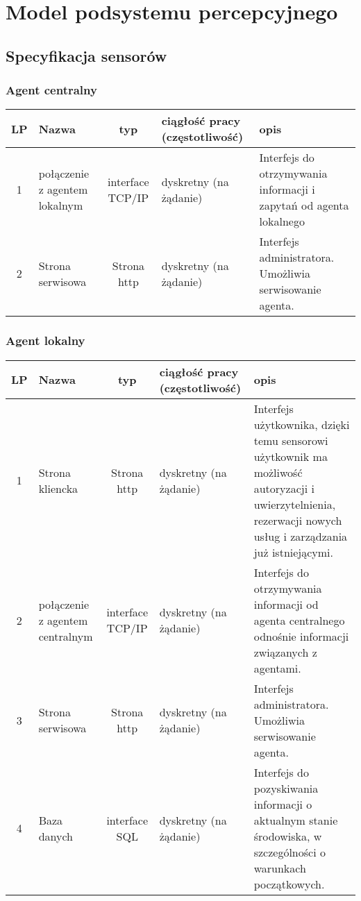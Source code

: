 \section{Model podsystemu percepcyjnego}
\subsection{Specyfikacja sensorów}
\subsubsection{Agent centralny}

\begin{tabular}{c|p{3cm}|c|p{2cm}|p{4cm}}
LP		& Nazwa			& typ			& ciągłość pracy (częstotliwość)	& opis\\
\hline
1 		& połączenie z agentem lokalnym		& interface TCP/IP	& dyskretny (na żądanie) & Interfejs do otrzymywania informacji i zapytań od agenta lokalnego \\
2		& Strona serwisowa		& Strona http	& dyskretny (na żądanie) & Interfejs administratora. Umożliwia serwisowanie agenta.\\
\end{tabular}

\subsubsection{Agent lokalny}

\begin{tabular}{c|p{3cm}|c|p{2cm}|p{4cm}}
LP		& Nazwa			& typ			& ciągłość pracy (częstotliwość) & opis \\
\hline
1 		& Strona kliencka		& Strona http	& dyskretny (na żądanie) & Interfejs użytkownika, dzięki temu sensorowi użytkownik ma możliwość autoryzacji i uwierzytelnienia, rezerwacji nowych usług i zarządzania już istniejącymi. \\
2 		& połączenie z agentem centralnym		& interface TCP/IP & dyskretny (na żądanie) 	& Interfejs do otrzymywania informacji od agenta centralnego odnośnie informacji związanych z agentami. \\
3		& Strona serwisowa 	& Strona http	& dyskretny (na żądanie) & Interfejs administratora. Umożliwia serwisowanie agenta.\\
4		& Baza danych		& interface SQL	& dyskretny (na żądanie) & Interfejs do pozyskiwania informacji o aktualnym stanie środowiska, w szczególności o warunkach początkowych.\\
\end{tabular}



